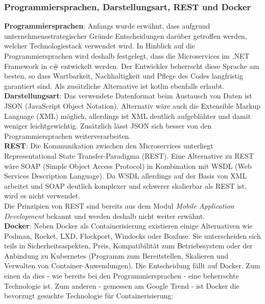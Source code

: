 {\subsubsection{Programmiersprachen, Darstellungsart, REST und Docker}
\textbf{Programmiersprachen}: Anfangs wurde erwähnt, dass aufgrund unternehmensstrategischer Gründe Entscheidungen darüber getroffen werden, welcher Technologiestack verwendet wird. In Hinblick auf die Programmiersprachen wird deshalb festgelegt, dass die Microservices im .NET Framework in c\# entwickelt werden. Der Entwickler beherrscht diese Sprache am besten, so dass Wartbarkeit, Nachhaltigkeit und Pflege des Codes langfristig garantiert sind. Als zusätzliche Alternative ist kotlin ebenfalls erlaubt.\\

\textbf{Darstellungsart}: Das verwendete Datenformat beim Austausch von Daten ist JSON (JavaScript Object Notation). Alternativ wäre auch die Extensible Markup Language (XML) möglich, allerdings ist XML deutlich aufgeblähter und damit weniger leichtgewichtig. Zusätzlich lässt JSON sich besser von den Programmiersprachen weiterverarbeiten.\cite{jsonxml2006heise}\\

\textbf{REST}: Die Kommunikation zwischen den Microservices unterliegt Representational State Transfer-Paradigma (REST). Eine Alternative zu REST wäre SOAP (Simple Object Access Protocol) in Kombination mit WSDL (Web Services Description Language). Da WSDL allerdings auf der Basis von XML arbeitet und SOAP deutlich komplexer und schwerer skalierbar als REST ist, wird es nicht verwendet. \cite{ayadi2008rest_vs_soap}\\ 

Die Prinzipien von REST sind bereits aus dem Modul \textit{Mobile Application Development} bekannt und werden deshalb nicht weiter erwähnt. \\

\textbf{Docker}: Neben Docker als Containerisierung existieren einige Alternativen wie Podman, Rocket, LXD, Flockport, Windocks oder Boxfuse. Sie unterscheiden sich teils in Sicherheitsaspekten, Preis, Kompatibilität zum Betriebssystem oder der Anbindung zu Kubernetes (Programm zum Bereitstellen, Skalieren und Verwalten von Container-Anwendungen).\cite{heise2019Podman}\cite{t3n2017Container} Die Entscheidung fällt auf Docker. Zum einen da dies - wie bereits bei den Programmiersprachen - eine beherrschte Technologie ist. Zum anderen - gemessen am Google Trend - ist Docker die bevorzugt gesuchte Technologie für Containerisierung:  

}
